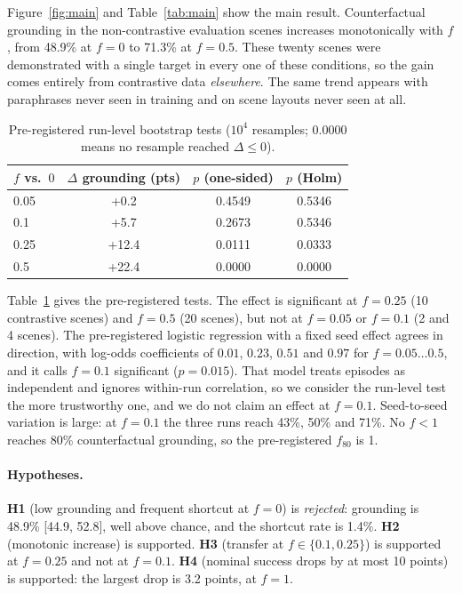\documentclass[11pt]{article}
\begin{document}
Figure~\ref{fig:main} and Table~\ref{tab:main} show the main result. Counterfactual grounding in
the non-contrastive evaluation scenes increases monotonically with $f$, from 48.9\% at $f{=}0$ to
71.3\% at $f{=}0.5$. These twenty scenes were demonstrated with a single target in every one of
these conditions, so the gain comes entirely from contrastive data \emph{elsewhere}. The same
trend appears with paraphrases never seen in training and on scene layouts never seen at all.

\begin{table}[h]
\centering\small
\begin{tabular}{lccc}
\toprule
$f$ vs.\ $0$ & $\Delta$ grounding (pts) & $p$ (one-sided) & $p$ (Holm) \\
\midrule
0.05 & +0.2 & 0.4549 & 0.5346 \\
0.1 & +5.7 & 0.2673 & 0.5346 \\
0.25 & +12.4 & 0.0111 & 0.0333 \\
0.5 & +22.4 & 0.0000 & 0.0000 \\
\bottomrule
\end{tabular}
\caption{Pre-registered run-level bootstrap tests ($10^4$ resamples; $0.0000$ means no
resample reached $\Delta\le0$).}
\label{tab:tests}
\end{table}

Table~\ref{tab:tests} gives the pre-registered tests. The effect is significant at $f{=}0.25$
(10 contrastive scenes) and $f{=}0.5$ (20 scenes), but not at $f{=}0.05$ or $f{=}0.1$ (2 and
4 scenes). The pre-registered logistic regression with a fixed seed effect agrees in direction,
with log-odds coefficients of $0.01$, $0.23$, $0.51$ and $0.97$ for $f=0.05\ldots0.5$, and it calls
$f{=}0.1$ significant ($p{=}0.015$). That model treats episodes as independent and ignores
within-run correlation, so we consider the run-level test the more trustworthy one, and we
do not claim an effect at $f{=}0.1$. Seed-to-seed variation is large: at $f{=}0.1$ the three runs
reach 43\%, 50\% and 71\%. No $f<1$ reaches 80\% counterfactual grounding, so the
pre-registered $f_{80}$ is 1.

\paragraph{Hypotheses.}
\textbf{H1} (low grounding and frequent shortcut at $f{=}0$) is \emph{rejected}: grounding is
48.9\% [44.9, 52.8], well above chance, and the shortcut rate is 1.4\%.
\textbf{H2} (monotonic increase) is supported.
\textbf{H3} (transfer at $f\in\{0.1, 0.25\}$) is supported at $f{=}0.25$ and not at $f{=}0.1$.
\textbf{H4} (nominal success drops by at most 10 points) is supported: the largest drop is
3.2 points, at $f{=}1$.
\end{document}
